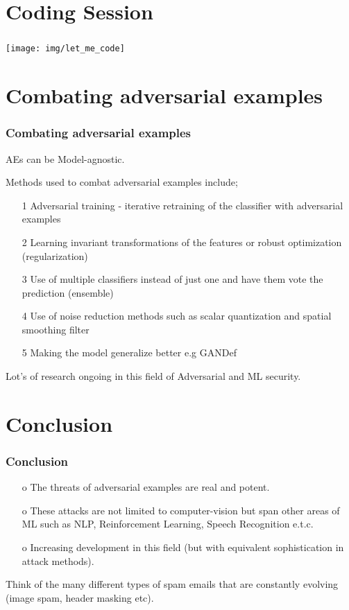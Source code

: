\documentclass[12pt]{beamer}
\begin{document}
\section{Coding Session}
\begin{frame}
\frametitle{}
\begin{center}
	\texttt{[image: img/let\_me\_code]}
\end{center}

\end{frame}

\section{Combating adversarial examples}
\begin{frame}
\frametitle{Combating adversarial examples}

AEs can be Model-agnostic.

Methods used to combat adversarial examples include\protect\footnotemark;
\begin{itemize}
	\item[1] Adversarial training - iterative retraining of the classifier with adversarial examples \pause
	\item[2] Learning invariant transformations of the features or robust optimization (regularization) \pause
	\item[3] Use of multiple classifiers instead of just one and have them vote the prediction (ensemble) \pause
	\item[4] Use of noise reduction methods such as scalar quantization and
spatial smoothing filter \protect\footnotemark 
	\item[5] Making the model generalize better e.g GANDef
\end{itemize}
{\small Lot's of research ongoing in this field of Adversarial and ML security.}

\end{frame}

\section{Conclusion}
\begin{frame}
\frametitle{Conclusion}
\begin{itemize}
	\item[o] The threats of adversarial examples are real and potent.
	\item[o] These attacks are not limited to computer-vision but span other areas of ML such as NLP, Reinforcement Learning, Speech Recognition e.t.c.
	\item[o] Increasing development in this field (but with equivalent sophistication in attack methods).
\end{itemize}
 
Think of the many different types of spam emails that are constantly evolving (image spam, header masking etc).
\end{frame}
\end{document}
